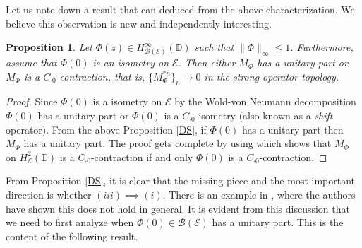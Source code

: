 \documentclass[12pt]{amsart}
\numberwithin{equation}{section}
\newtheorem{propn}{Proposition}[section]
\theoremstyle{definition}
\newcommand{\D}{\mathbb{D}}
\newcommand{\1}{{\mbox{\bf 1}}}
\newcommand{\clb}{\mathcal{B}}
\newcommand{\cle}{\mathcal{E}}
\newcommand{\raro}{\rightarrow}
\begin{document}
Let us note down a result that can deduced from the above characterization. We believe this observation is new and independently interesting.
\begin{propn}
Let $\Phi(z) \in H_{\clb(\cle)}^{\infty}(\D)$ such that $\|\Phi\|_{\infty} \leq 1$. Furthermore, assume that $\Phi(0)$ is an isometry on $\cle$. Then either $M_{\Phi}$ has a unitary part or $M_{\Phi}$ is a $C_{\cdot 0}$-contraction, that is, $\{M_{\Phi}^{*n }\}_n \raro 0$ in the strong operator topology.
\end{propn}
\begin{proof}
Since $\Phi(0)$ is a isometry on $\cle$ by the Wold-von Neumann decomposition $\Phi(0)$ has  a unitary part or $\Phi(0)$ is a $C_{\cdot 0}$-isometry (also known as a \textit{shift} operator). From the above Proposition \ref{DS}, if $\Phi(0)$ has a unitary part then $M_{\Phi}$ has a unitary part.  The proof gets complete by using \cite[Theorem 3.4]{Sarkar} which shows that $M_{\Phi}$ on $H_{\cle}^2(\D)$ is a $C_{\cdot 0}$-contraction if and only $\Phi(0)$ is a $C_{\cdot 0}$-contraction.
\end{proof}
From Proposition \ref{DS}, it is clear that the missing piece and the most important direction is whether $(iii) \implies (i)$.  There is an example in \cite[Remark 3.2]{DSau}, where the authors have shown this does not hold in general.  It is evident from this discussion that we need to first analyze when $\Phi(0) \in \clb(\cle)$ has a unitary part. This is the content of the following result. 
\end{document}
